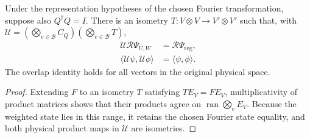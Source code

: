 \begin{lemma}%
    \label{thm:peps_torus_semiregular_isometric_extension}
    \leanok
    Under the representation hypotheses of the chosen Fourier transformation,
    suppose also $Q^\dagger Q=I$. There is an isometry
    $T:V\otimes V\to V'\otimes V'$ such that, with
    $\mathcal U=(\bigotimes_{e\in\mathcal B}C_Q)
        (\bigotimes_{e\in\mathcal B}T)$,
    \begin{align}
        \mathcal U\mathcal R\Psi_{U,W} & =\mathcal R\Psi_{\mathrm{reg}}, \\
        \langle\mathcal U\psi,\mathcal U\phi\rangle
                                       & =\langle\psi,\phi\rangle.
    \end{align}
    The overlap identity holds for all vectors in the original physical space.
\end{lemma}
\begin{proof}\leanok
    Extending $F$ to an isometry $T$ satisfying $TE_V=FE_V$, multiplicativity
    of product matrices shows that their products agree on
    $\operatorname{ran}\bigotimes_e E_V$. Because the weighted state lies
    in this range, it retains the chosen Fourier state equality, and
    both physical product maps in $\mathcal U$ are isometries.
\end{proof}

